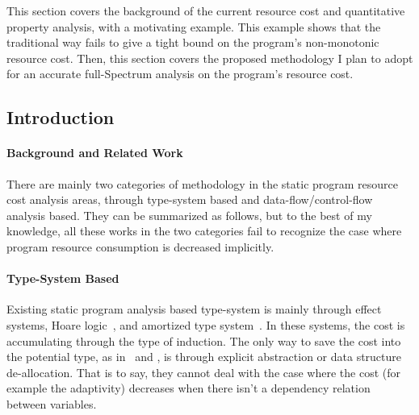 This section covers the background of the current resource cost and quantitative property analysis,
with a 
motivating example.
This example shows that the traditional way fails to give a tight bound on the program's non-monotonic resource cost.
Then, this section covers the proposed methodology I plan to adopt for an accurate full-Spectrum
analysis on 
the program's resource cost.
\subsection{Introduction}
\label{subsubsec:furthers-cost-backgroung}
\paragraph*{Background and Related Work}There are mainly two categories of methodology in the static program resource cost analysis areas, 
through type-system based and data-flow/control-flow analysis based. 
They can be summarized as follows, but to the best of my knowledge,
all these works in the two categories fail to recognize the case where program resource consumption is decreased implicitly.
 \paragraph*{Type-System Based}
Existing
static program analysis based type-system is mainly through 
effect systems, 
Hoare logic~\cite{gaboardi2021graded}, and amortized type system~\cite{hoffmann_jost_2022}.
%
In these systems, the cost is accumulating through the type of induction. 
The only way to save the cost into the potential
type, as in~\cite{GustafssonEL05} and \cite{hoffmann_jost_2022}, 
is through explicit abstraction or data structure de-allocation.
That is to say, they cannot deal with the case where the cost (for example the adaptivity) decreases when there isn't a dependency relation between variables.

